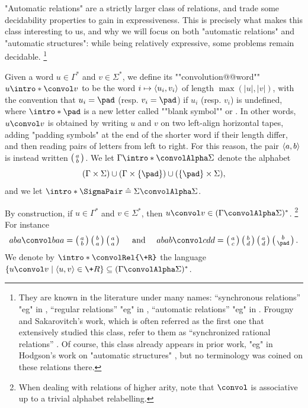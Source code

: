 "Automatic relations" are a strictly larger class of relations,
and trade some decidability properties to gain in expressiveness.
This is precisely what makes this class interesting to us, and why we will focus
on both "automatic relations" and "automatic structures": while being relatively
expressive, some problems remain decidable.%
\footnote{They are known in the literature under many names:
``synchronous relations''
	"eg" in \cite[Definition~2.3]{CartonChoffrutGrigorieff2006DecisionProblems},
``regular relations''
	"eg" in \cite[Definition~2.2]{KhoussainovNerode1995AutomaticPresentations},
``automatic relations''
	"eg" in \cite[\S~2.1]{LodingSpinrath2019DecisionProblems}.
Frougny and Sakarovitch's work, which is often referred as the first one
that extensively studied this class, refer to them as ``synchronized rational relations''
\cite[\S~4]{FrougnySakarovitch1993SynchronizedRationalRelations}.
Of course, this class already appears in prior work, "eg" in Hodgson's work on
"automatic structures" \cite{Hodgson1983Decidabilite}, but no terminology was coined on these relations there.}

Given a word $u \in \Gamma^*$ and $v\in \Sigma^*$, we define
its \AP""convolution@@word"" $u \intro*\convol v$ to be the word
$i \mapsto \langle u_i, v_i\rangle$ of length $\max{(|u|,|v|)}$,
with the convention that $u_i = \pad$ (resp. $v_i = \pad$)
if $u_i$ (resp. $v_i$) is undefined, where $\intro*\pad$ is a new letter called
""blank symbol"" or . In other words,
$u \convol v$ is obtained by writing $u$ and $v$ on two left-align horizontal tapes,
adding "padding symbols" at the end of the shorter word if their length differ,
and then reading pairs of letters from left to right.
For this reason, the pair $\langle a,b\rangle$ is instead written $\pair{a}{b}$.
We let \AP$\Gamma \intro*\convolAlpha \Sigma$ denote the alphabet
\[(\Gamma \times \Sigma) \cup (\Gamma \times \{\pad\}) \cup (\{\pad\} \times \Sigma),\]
and we let $\intro*\SigmaPair \defeq \Sigma \convolAlpha \Sigma$.

By construction, if $u \in \Gamma^*$ and $v\in \Sigma^*$, then $u\convol v \in (\Gamma\convolAlpha\Sigma)^*$.%
\footnote{When dealing with relations of higher arity, note that $\convol$ is associative up to a trivial
alphabet relabelling.}
For instance
\[
	aba \convol baa = \pair{a}{b}\pair{b}{a}\pair{a}{a}
	\quad\text{ and }\quad
	abab \convol cdd = \pair{a}{c}\pair{b}{d}\pair{a}{d}\pair{b}{\pad}.
\]
We denote by \AP$\intro*\convolRel{\+R}$ the language
$\{ u \convol v \mid \tup{u,v} \in \+R\} \subseteq (\Gamma\convolAlpha\Sigma)^*$.

